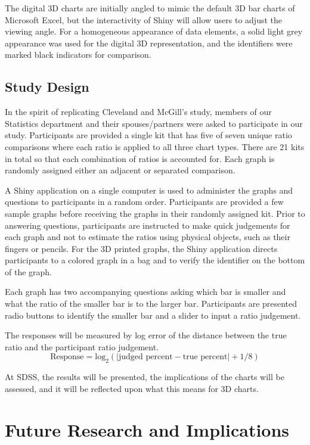 \documentclass[10pt]{article}
\begin{document}
The digital 3D charts are initially angled to mimic the default 3D bar charts of Microsoft Excel, but the interactivity of Shiny will allow users to adjust the viewing angle. 
For a homogeneous appearance of data elements, a solid light grey appearance was used for the digital 3D representation, and the identifiers were marked black indicators for comparison.

\subsection{Study Design}

In the spirit of replicating Cleveland and McGill's study, members of our Statistics department and their spouses/partners were asked to participate in our study.
Participants are provided a single kit that has five of seven unique ratio comparisons where each ratio is applied to all three chart types. 
There are 21 kits in total so that each combination of ratios is accounted for.
Each graph is randomly assigned either an adjacent or separated comparison.

A Shiny application on a single computer is used to administer the graphs and questions to participants in a random order. 
Participants are provided a few sample graphs before receiving the graphs in their randomly assigned kit.
Prior to answering questions, participants are instructed to make quick judgements for each graph and not to estimate the ratios using physical objects, such as their fingers or pencils.
For the 3D printed graphs, the Shiny application directs participants to a colored graph in a bag and to verify the identifier on the bottom of the graph. 

Each graph has two accompanying questions asking which bar is smaller and what the ratio of the smaller bar is to the larger bar. 
Participants are presented radio buttons to identify the smaller bar and a slider to input a ratio judgement.

The responses will be measured by log error of the distance between the true ratio and the participant ratio judgement.
$$\text{Response}=\text{log}_2(|\text{judged percent}-\text{true percent}|+1/8)$$

At SDSS, the results will be presented, the implications of the charts will be assessed, and it will be reflected upon what this means for 3D charts.

\section{Future Research and Implications}
\end{document}
